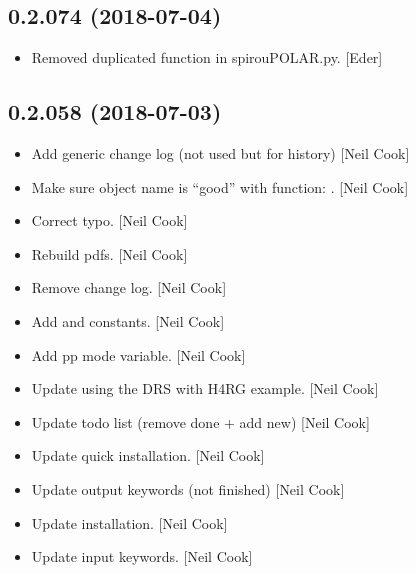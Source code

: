 \documentclass[a4paper,10pt,english]{report}
\begin{document}
\subsection{0.2.074 (2018-07-04)}
\label{\detokenize{misc/changelog:id403}}\begin{itemize}
\item {} 
Removed duplicated function  in spirouPOLAR.py.
{[}Eder{]}

\end{itemize}


\subsection{0.2.058 (2018-07-03)}
\label{\detokenize{misc/changelog:id404}}\begin{itemize}
\item {} 
Add generic change log (not used but for history) {[}Neil Cook{]}

\item {} 
Make sure object name is “good” with function: .
{[}Neil Cook{]}

\item {} 
Correct typo. {[}Neil Cook{]}

\item {} 
Rebuild pdfs. {[}Neil Cook{]}

\item {} 
Remove change log. {[}Neil Cook{]}

\item {} 
Add  and  constants. {[}Neil Cook{]}

\item {} 
Add pp mode variable. {[}Neil Cook{]}

\item {} 
Update using the DRS with H4RG example. {[}Neil Cook{]}

\item {} 
Update todo list (remove done + add new) {[}Neil Cook{]}

\item {} 
Update quick installation. {[}Neil Cook{]}

\item {} 
Update output keywords (not finished) {[}Neil Cook{]}

\item {} 
Update installation. {[}Neil Cook{]}

\item {} 
Update input keywords. {[}Neil Cook{]}


\end{itemize}
\end{document}
